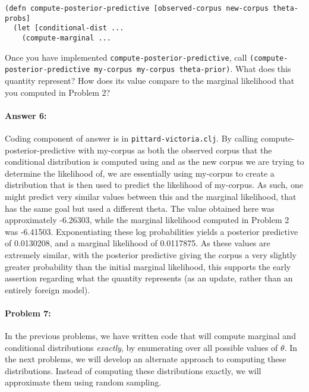 \documentclass[10pt]{article}
\begin{document}
\begin{lstlisting}
(defn compute-posterior-predictive [observed-corpus new-corpus theta-probs]
  (let [conditional-dist ...
    (compute-marginal ...
\end{lstlisting}

\noindent Once you have implemented
\texttt{compute-posterior-predictive}, call
\texttt{(compute-posterior-predictive my-corpus my-corpus
  theta-prior)}. What does this quantity represent? How does its value
compare to the marginal likelihood that you computed in Problem 2?

\paragraph{Answer 6:} Coding component of answer is in
\texttt{pittard-victoria.clj}.\newline
By calling compute-posterior-predictive with my-corpus as both the observed corpus that the conditional distribution is computed using and as the new corpus we are trying to determine the likelihood of, we are essentially using my-corpus to create a distribution that is then used to predict the likelihood of my-corpus. As such, one might predict very similar values between this and the marginal likelihood, that has the same goal but used a different theta. \newline\newline
The value obtained here was approximately -6.26303, while the marginal likelihood computed in Problem 2 was -6.41503. Exponentiating these log probabilities yields a posterior predictive of 0.0130208, and a marginal likelihood of 0.0117875. As these values are extremely similar, with the posterior predictive giving the corpus a very slightly greater probability than the initial marginal likelihood, this supports the early assertion regarding what the quantity represents (as an update, rather than an entirely foreign model).

\hrulefill
\paragraph{Problem 7:}

In the previous problems, we have written code that will compute
marginal and conditional distributions \emph{exactly}, by enumerating
over all possible values of $\theta$. In the next problems, we will
develop an alternate approach to computing these
distributions. Instead of computing these distributions exactly, we
will approximate them using random sampling.
\\
\end{document}
